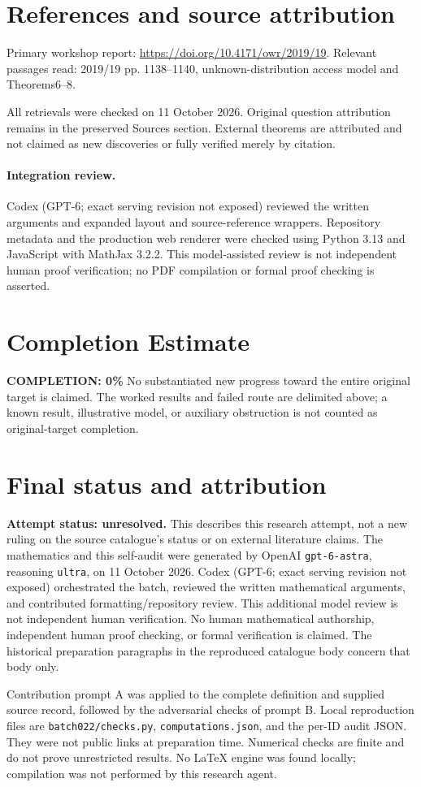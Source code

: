 \documentclass[11pt]{article}
\begin{document}
\section{References and source attribution}
Primary workshop report: \url{https://doi.org/10.4171/owr/2019/19}. Relevant passages read: 2019/19 pp. 1138--1140, unknown-distribution access model and Theorems6--8.

All retrievals were checked on 11 October 2026. Original question attribution remains in the preserved Sources section. External theorems are attributed and not claimed as new discoveries or fully verified merely by citation.


\paragraph{Integration review.} Codex (GPT-6; exact serving revision not exposed) reviewed the written arguments and expanded layout and source-reference wrappers. Repository metadata and the production web renderer were checked using Python 3.13 and JavaScript with MathJax 3.2.2. This model-assisted review is not independent human proof verification; no PDF compilation or formal proof checking is asserted.

\section{Completion Estimate}
\noindent\textbf{COMPLETION: 0\%}
No substantiated new progress toward the entire original target is claimed. The worked results and failed route are delimited above; a known result, illustrative model, or auxiliary obstruction is not counted as original-target completion.

\section{Final status and attribution}
\textbf{Attempt status: unresolved.} This describes this research attempt, not a new ruling on the source catalogue's status or on external literature claims.
The mathematics and this self-audit were generated by OpenAI \texttt{gpt-6-astra}, reasoning \texttt{ultra}, on 11 October 2026. Codex (GPT-6; exact serving revision not exposed) orchestrated the batch, reviewed the written mathematical arguments, and contributed formatting/repository review. This additional model review is not independent human verification. No human mathematical authorship, independent human proof checking, or formal verification is claimed. The historical preparation paragraphs in the reproduced catalogue body concern that body only.

Contribution prompt A was applied to the complete definition and supplied source record, followed by the adversarial checks of prompt B. Local reproduction files are \texttt{batch022/checks.py}, \texttt{computations.json}, and the per-ID audit JSON. They were not public links at preparation time. Numerical checks are finite and do not prove unrestricted results. No LaTeX engine was found locally; compilation was not performed by this research agent.
\end{document}
